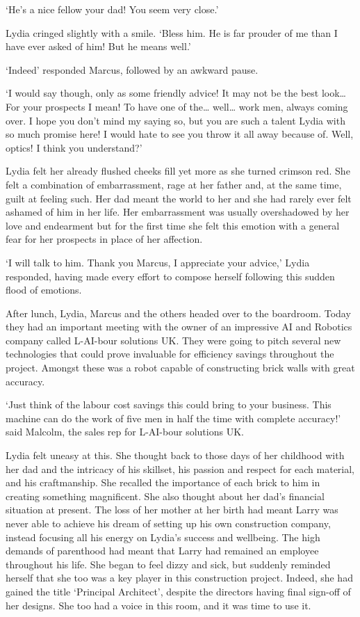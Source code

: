 `He's a nice fellow your dad! You seem very close.'

Lydia cringed slightly with a smile. `Bless him. He is far prouder of
me than I have ever asked of him! But he means well.'

`Indeed' responded Marcus, followed by an awkward pause.

`I would say though, only as some friendly advice! It may not be the
best look… For your prospects I mean! To have one of the… well…
work men, always coming over. I hope you don't mind my saying so,
but you are such a talent Lydia with so much promise here! I would
hate to see you throw it all away because of. Well, optics! I
think you understand?'

Lydia felt her already flushed cheeks fill yet more as she turned
crimson red. She felt a combination of embarrassment, rage at her
father and, at the same time, guilt at feeling such. Her dad meant the
world to her and she had rarely ever felt ashamed of him in her
life. Her embarrassment was usually overshadowed by her love and
endearment but for the first time she felt this emotion with a general
fear for her prospects in place of her affection.

`I will talk to him. Thank you Marcus, I appreciate your advice,'
Lydia responded, having made every effort to compose herself following
this sudden flood of emotions.

After lunch, Lydia, Marcus and the others headed over to the
boardroom. Today they had an important meeting with the owner of an
impressive AI and Robotics company called L-AI-bour solutions UK. They
were going to pitch several new technologies that could prove
invaluable for efficiency savings throughout the project.  Amongst
these was a robot capable of constructing brick walls with great
accuracy.

`Just think of the labour cost savings this could bring to your
business. This machine can do the work of five men in half the time
with complete accuracy!' said Malcolm, the sales rep for L-AI-bour
solutions UK.

Lydia felt uneasy at this. She thought back to those days of her
childhood with her dad and the intricacy of his skillset, his passion
and respect for each material, and his craftmanship. She recalled the
importance of each brick to him in creating something magnificent. She
also thought about her dad's financial situation at present. The loss
of her mother at her birth had meant Larry was never able to achieve
his dream of setting up his own construction company, instead focusing
all his energy on Lydia's success and wellbeing. The high demands of
parenthood had meant that Larry had remained an employee throughout
his life. She began to feel dizzy and sick, but suddenly reminded
herself that she too was a key player in this construction
project. Indeed, she had gained the title `Principal Architect',
despite the directors having final sign-off of her designs. She too
had a voice in this room, and it was time to use it.

